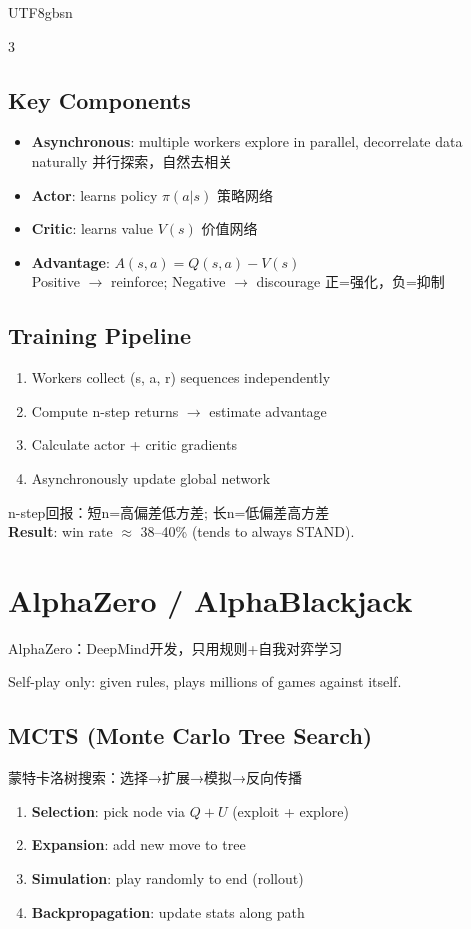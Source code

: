 \documentclass[9pt,landscape,a4paper]{article}
\newcommand{\zhint}[1]{{\scriptsize\color{gray!70!black}#1}}
\begin{document}
\begin{CJK}{UTF8}{gbsn}
\begin{multicols}{3}
\subsection{Key Components}
\begin{itemize}[leftmargin=8pt,itemsep=0pt,topsep=0pt]
\item \textbf{Asynchronous}: multiple workers explore in parallel, decorrelate data naturally \zhint{并行探索，自然去相关}
\item \textbf{Actor}: learns policy $\pi(a|s)$ \zhint{策略网络}
\item \textbf{Critic}: learns value $V(s)$ \zhint{价值网络}
\item \textbf{Advantage}: $A(s,a) = Q(s,a) - V(s)$\\
Positive $\to$ reinforce; Negative $\to$ discourage \zhint{正=强化，负=抑制}
\end{itemize}

\subsection{Training Pipeline}
\begin{enumerate}[leftmargin=10pt,itemsep=0pt,topsep=0pt]
\item Workers collect (s, a, r) sequences independently
\item Compute n-step returns $\to$ estimate advantage
\item Calculate actor + critic gradients
\item Asynchronously update global network
\end{enumerate}
\zhint{n-step回报：短n=高偏差低方差; 长n=低偏差高方差}\\
\textbf{Result}: win rate $\approx$ 38--40\% (tends to always STAND).

\section{AlphaZero / AlphaBlackjack}
\zhint{AlphaZero：DeepMind开发，只用规则+自我对弈学习}

Self-play only: given rules, plays millions of games against itself.

\subsection{MCTS (Monte Carlo Tree Search)}
\zhint{蒙特卡洛树搜索：选择→扩展→模拟→反向传播}
\begin{enumerate}[leftmargin=10pt,itemsep=0pt,topsep=0pt]
\item \textbf{Selection}: pick node via $Q + U$ (exploit + explore)
\item \textbf{Expansion}: add new move to tree
\item \textbf{Simulation}: play randomly to end (rollout)
\item \textbf{Backpropagation}: update stats along path
\end{enumerate}


\end{multicols}
\end{CJK}
\end{document}
